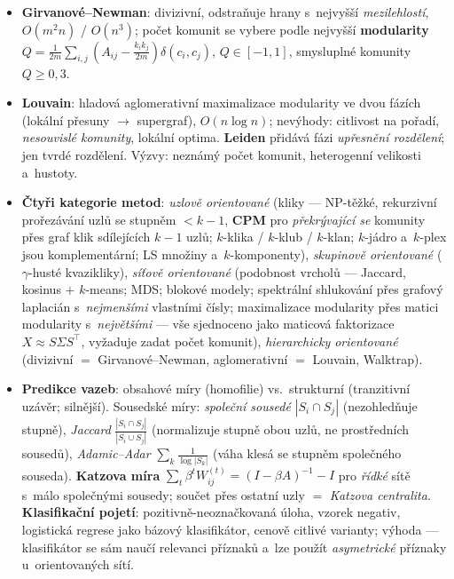 \documentclass[11pt,a4paper]{article}
\theoremstyle{definition}
\begin{document}
\begin{itemize}
{ řez} (dělení $|C_i|$, resp.\ $\mathrm{vol}(C_i)$).
\item \textbf{Girvanové--Newman}: divizivní, odstraňuje hrany s~nejvyšší \emph{mezilehlostí},
 $O(m^2n)$ / $O(n^3)$; počet komunit se vybere podle nejvyšší \textbf{modularity}
 $Q=\frac{1}{2m}\sum_{i,j}(A_{ij}-\frac{k_ik_j}{2m})\delta(c_i,c_j)$, $Q\in[-1,1]$,
 smysluplné komunity $Q\ge 0{,}3$.
\item \textbf{Louvain}: hladová aglomerativní maximalizace modularity ve dvou fázích (lokální
 přesuny $\to$ supergraf), $O(n\log n)$; nevýhody: citlivost na pořadí, \emph{nesouvislé
 komunity}, lokální optima. \textbf{Leiden} přidává fázi \emph{upřesnění rozdělení}; jen
 tvrdé rozdělení. Výzvy: neznámý počet komunit, heterogenní velikosti a~hustoty.
\item \textbf{Čtyři kategorie metod}: \emph{uzlově orientované} (kliky --- NP-těžké, rekurzivní
 prořezávání uzlů se stupněm $<k-1$, \textbf{CPM} pro \emph{překrývající se} komunity
 přes graf klik sdílejících $k-1$ uzlů; $k$-klika / $k$-klub / $k$-klan; $k$-jádro
 a~$k$-plex jsou komplementární; LS množiny a~$k$-komponenty), \emph{skupinově
 orientované} ($\gamma$-husté kvazikliky), \emph{síťově orientované} (podobnost vrcholů ---
 Jaccard, kosinus $+$ $k$-means; MDS; blokové modely; spektrální shlukování přes grafový
 laplacián s~\emph{nejmenšími} vlastními čísly; maximalizace modularity přes matici
 modularity s~\emph{největšími} --- vše sjednoceno jako maticová faktorizace
 $X\approx S\Sigma S^{\!\top}$, vyžaduje zadat počet komunit), \emph{hierarchicky
 orientované} (divizivní $=$ Girvanové--Newman, aglomerativní $=$ Louvain, Walktrap).
\item \textbf{Predikce vazeb}: obsahové míry (homofilie) vs.\ strukturní (tranzitivní uzávěr;
 silnější). Sousedské míry: \emph{společní sousedé} $|S_i\cap S_j|$ (nezohledňuje stupně),
 \emph{Jaccard} $\frac{|S_i\cap S_j|}{|S_i\cup S_j|}$ (normalizuje stupně obou uzlů, ne
 prostředních sousedů), \emph{Adamic--Adar} $\sum_{k}\frac{1}{\log|S_k|}$ (váha klesá se
 stupněm společného souseda). \textbf{Katzova míra}
 $\sum_t\beta^tW_{ij}^{(t)}=(I-\beta A)^{-1}-I$ pro \emph{řídké} sítě s~málo společnými
 sousedy; součet přes ostatní uzly $=$ \emph{Katzova centralita}. \textbf{Klasifikační
 pojetí}: pozitivně-neoznačkovaná úloha, vzorek negativ, logistická regrese jako bázový
 klasifikátor, cenově citlivé varianty; výhoda --- klasifikátor se sám naučí relevanci
 příznaků a~lze použít \emph{asymetrické} příznaky u~orientovaných sítí.
\end{itemize}
\end{document}

